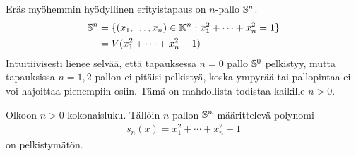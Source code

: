 Eräs myöhemmin hyödyllinen erityistapaus on $n$-pallo $\S^n$.
\begin{align*}
    \S^n&=\{(x_1,\dots,x_n)\in\K^n:x_1^2+\cdots+x_n^2=1\} \\
    &=V(x_1^2+\cdots+x_n^2-1)
\end{align*}
Intuitiivisesti lienee selvää, että tapauksessa $n=0$ pallo $\S^0$ pelkistyy, mutta tapauksissa $n=1,2$ pallon ei pitäisi pelkistyä, koska ympyrää tai pallopintaa ei voi hajoittaa pienempiin osiin. Tämä on mahdollista todistaa kaikille $n>0$.
\begin{lemma}
    \label{lemma:pallo-on-pelkistymätön}
    Olkoon $n>0$ kokonaisluku. Tällöin $n$-pallon $\S^n$ määrittelevä polynomi
    \begin{align*}
        s_n(x)=x_1^2+\cdots+x_n^2-1
    \end{align*}
    on pelkistymätön.
\end{lemma}
